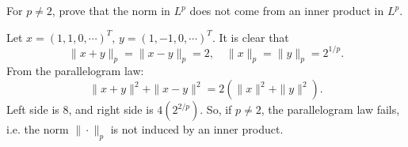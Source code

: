 \documentclass[11pt]{article}
\numberwithin{equation}{section}
\newcounter{exercise}[section]
\newenvironment{exercise}[1][\textsc{Exercise }\thesection.\refstepcounter{exercise}\theexercise]{\begin{tcolorbox}[colback=black!15, colframe=black!80, breakable, title=\textsc{Exercise }#1]}{\end{tcolorbox}}
\newenvironment{solution}{\begin{tcolorbox}[colback=white, colframe=black!50, breakable, title=Solution. ]\setlength{\parskip}{0.8em}}{\end{tcolorbox}}
\begin{document}
        \begin{exercise}[(16)]
            For $p \neq 2$, prove that the norm in $L^p$ does not come from an inner product in $L^p$. 
        \end{exercise}

        \begin{solution}
            Let $x=(1,1,0,\cdots)^T$, $y=(1,-1,0,\cdots)^T$. It is clear that 
            \[
                \|x+y\|_{p}=\|x-y\|_{p}=2, \quad\|x\|_{p}=\|y\|_{p}=2^{1 / p} .
            \]
            From the parallelogram law: 
            \[
            \|x+y\|^{2}+\|x-y\|^{2}=2\left(\|x\|^{2}+\|y\|^{2}\right). 
            \]
            Left side is $8$, and right side is $4(2^{2 / p})$. So, if $p \neq 2$, the parallelogram law fails, i.e. the norm $\|\cdot\|_{p}$ is not induced by an inner product. 
        \end{solution}
    

    \printbibliography
\end{document}

